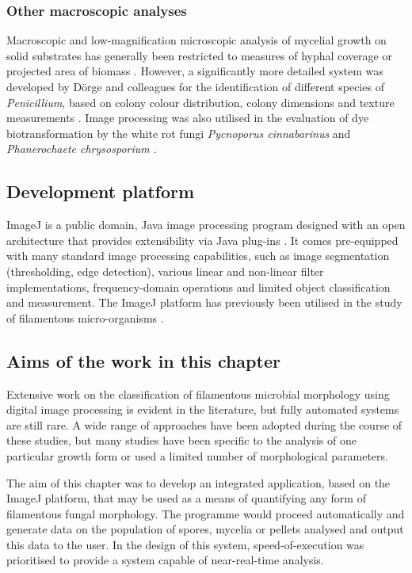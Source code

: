 \subsubsection{Other macroscopic analyses}

Macroscopic and low-magnification microscopic analysis of mycelial growth on solid substrates has generally been restricted to measures of hyphal coverage or projected area of biomass \cite{couri2006,cross2004}. However, a significantly more detailed system was developed by D\"{o}rge and colleagues for the identification of different species of \emph{Penicillium}, based on colony colour distribution, colony dimensions and texture measurements \cite{dorge2000}. Image processing was also utilised in the evaluation of dye biotransformation by the white rot fungi \emph{Pycnoporus cinnabarinus} and \emph{Phanerochaete chrysosporium} \cite{jones1993b}.

\subsection{Development platform}

ImageJ is a public domain, Java image processing program designed with an open architecture that provides extensibility via Java plug-ins \cite{imagej}. It comes pre-equipped with many standard image processing capabilities, such as image segmentation (thresholding, edge detection), various linear and non-linear filter implementations, frequency-domain operations and limited object classification and measurement. The ImageJ platform has previously been utilised in the study of filamentous micro-organisms \cite{papagianni2006b,rahardjo2005b,tebiesebeke2005}. 

\subsection{Aims of the work in this chapter}

Extensive work on the classification of filamentous microbial morphology using digital image processing is evident in the literature, but fully automated systems are still rare. A wide range of approaches have been adopted during the course of these studies, but many studies have been specific to the analysis of one particular growth form or used a limited number of morphological parameters.

The aim of this chapter was to develop an integrated application, based on the ImageJ platform, that may be used as a means of quantifying any form of filamentous fungal morphology. The programme would proceed automatically and generate data on the population of spores, mycelia or pellets analysed and output this data to the user. In the design of this system, speed-of-execution was prioritised to provide a system capable of near-real-time analysis.

